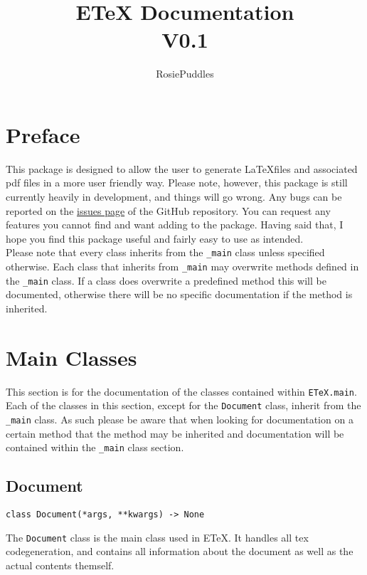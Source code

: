 \documentclass{article}
\title{ETeX Documentation\\\large V0.1}
\date{}
\author{RosiePuddles}
\begin{document}
\maketitle
\tableofcontents
\newpage

\section[Preface]{Preface}
This package is designed to allow the user to generate \LaTeX  files and associated pdf files in a more user friendly way. Please note, however, this package is still currently heavily in development, and things will go wrong. Any bugs can be reported on the \href{https:/github.comRosiePuddlesETeX_from_pythonissues}{issues page} of the GitHub repository. You can request any features you cannot find and want adding to the package. Having said that, I hope you find this package useful and fairly easy to use as intended.\\
Please note that every class inherits from the \verb|_main| class unless specified otherwise. Each class that inherits from \verb|_main| may overwrite methods defined in the \verb|_main| class. If a class does overwrite a predefined method this will be documented, otherwise there will be no specific documentation if the method is inherited.
\section[Main Classes]{Main Classes}
This section is for the documentation of the classes contained within \verb|ETeX.main|.\\
Each of the classes in this section, except for the \verb|Document| class, inherit from the \verb|_main| class. As such please be aware that when looking for documentation on a certain method that the method may be inherited and documentation will be contained within the \verb|_main| class section.
\subsection[Document]{Document}
\lstset{language=python}
\begin{lstlisting}
class Document(*args, **kwargs) -> None
\end{lstlisting}
The \verb|Document| class is the main class used in ETeX. It handles all tex codegeneration, and contains all information about the document as well as the actual contents themself.
\end{document}
